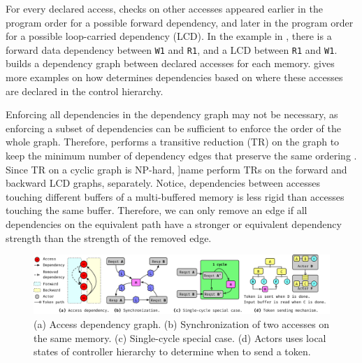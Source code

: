 For every declared access, \name{} checks on other accesses appeared earlier in the program order
for a possible forward dependency, and later in the program order for a possible loop-carried dependency (LCD). 
In the example in , there is a forward data dependency between \texttt{W1} and
\texttt{R1}, and a LCD between \texttt{R1} and \texttt{W1}. 
\name builds a dependency graph between declared accesses for each memory.
 gives more examples on how \name
determines dependencies based on where these accesses are declared in the control hierarchy.

Enforcing all dependencies in the dependency graph may not be necessary, as enforcing a subset of
dependencies can be sufficient to enforce the order of the whole graph.
Therefore, \name performs a transitive reduction (TR) on the graph to keep the minimum number of dependency edges 
that preserve the same ordering \cite{tr}.
Since TR on a cyclic graph is NP-hard, ]name perform TRs on the forward and backward LCD graphs, separately.
Notice, dependencies between accesses touching different buffers of a multi-buffered memory is less rigid 
than accesses touching the same buffer.
Therefore, we can only remove an edge if all dependencies on the equivalent path have a stronger or equivalent 
dependency strength than the strength of the removed edge.


\begin{figure}
\centering
\includegraphics[width=1.0\textwidth]{figs/synch_mech.pdf}
\caption{
    (a) Access dependency graph.
    (b) Synchronization of two accesses on the same memory.
    (c) Single-cycle special case.
    (d) Actors uses local states of controller hierarchy to determine when to send a token.
}\label{fig:depgraph}\label{fig:token}\label{fig:tokentrick}\label{fig:tokenwhen}
\end{figure}

